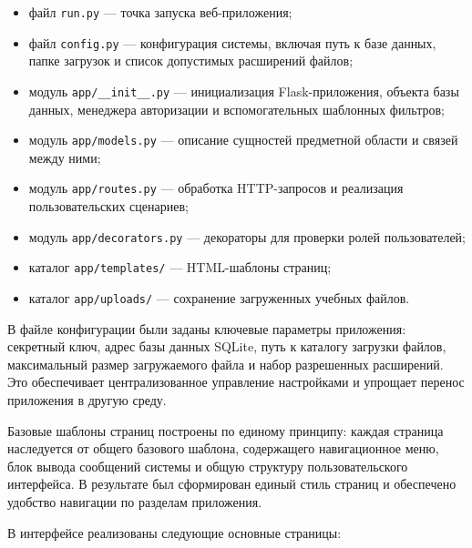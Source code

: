 \documentclass[14pt,a4paper]{extarticle}
\begin{document}
\begin{itemize}[leftmargin=1.25cm]
    \item файл \texttt{run.py} --- точка запуска веб-приложения;
    \item файл \texttt{config.py} --- конфигурация системы, включая путь к базе данных, папке загрузок и список допустимых расширений файлов;
    \item модуль \texttt{app/\_\_init\_\_.py} --- инициализация Flask-приложения, объекта базы данных, менеджера авторизации и вспомогательных шаблонных фильтров;
    \item модуль \texttt{app/models.py} --- описание сущностей предметной области и связей между ними;
    \item модуль \texttt{app/routes.py} --- обработка HTTP-запросов и реализация пользовательских сценариев;
    \item модуль \texttt{app/decorators.py} --- декораторы для проверки ролей пользователей;
    \item каталог \texttt{app/templates/} --- HTML-шаблоны страниц;
    \item каталог \texttt{app/uploads/} --- сохранение загруженных учебных файлов.
\end{itemize}

В файле конфигурации были заданы ключевые параметры приложения: секретный ключ, адрес базы данных SQLite, путь к каталогу загрузки файлов, максимальный размер загружаемого файла и набор разрешенных расширений. Это обеспечивает централизованное управление настройками и упрощает перенос приложения в другую среду.

Базовые шаблоны страниц построены по единому принципу: каждая страница наследуется от общего базового шаблона, содержащего навигационное меню, блок вывода сообщений системы и общую структуру пользовательского интерфейса. В результате был сформирован единый стиль страниц и обеспечено удобство навигации по разделам приложения.

В интерфейсе реализованы следующие основные страницы:
\end{document}
